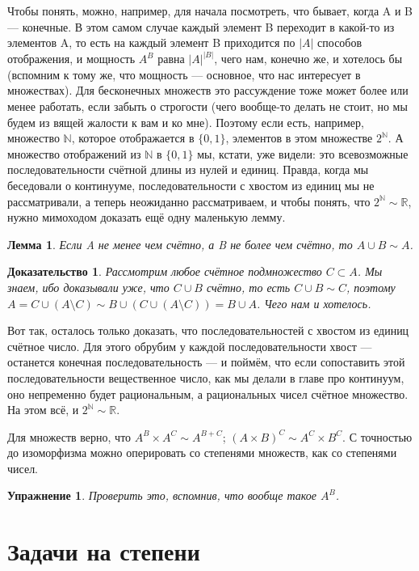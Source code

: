 \documentclass[12pt, onecolumn]{report}
\newtheorem*{lemma}{Лемма}
\newtheorem*{exe}{Упражнение}
\newtheorem*{lproof}{Доказательство}
\begin{document}
Чтобы понять, можно, например, для начала посмотреть, что бывает, когда A и B --- конечные. В этом самом случае каждый элемент B переходит в какой-то из элементов A, то есть на каждый элемент B приходится по $|A|$ способов отображения, и мощность $A^B$ равна $|A|^|B|$, чего нам, конечно же, и хотелось бы (вспомним к тому же, что мощность --- основное, что нас интересует в множествах). Для бесконечных множеств это рассуждение тоже может более или менее работать, если забыть о строгости (чего вообще-то делать не стоит, но мы будем из вящей жалости к вам и ко мне). Поэтому если есть, например, множество $\mathbb N$, которое отображается в $\{0, 1\}$, элементов в этом множестве $2^{\mathbb N}$. А множество отображений из $\mathbb N$ в $\{0, 1\}$ мы, кстати, уже видели: это всевозможные последовательности счётной длины из нулей и единиц. Правда, когда мы беседовали о континууме, последовательности с хвостом из единиц мы не рассматривали, а теперь неожиданно рассматриваем, и чтобы понять, что $2^{\mathbb N} \sim \mathbb R$, нужно мимоходом доказать ещё одну маленькую лемму.

\begin{lemma}
Если A не менее чем счётно, а B не более чем счётно, то $A\cup B \sim A$.
\end{lemma}
\begin{lproof}
\emph{Рассмотрим любое счётное подмножество $C \subset A$. Мы знаем, ибо доказывали уже, что $C \cup B$ счётно, то есть $C \cup B \sim C$, поэтому $A=C\cup (A\setminus C) \sim B\cup (C \cup (A\setminus C)) = B \cup A$. Чего нам и хотелось.}
\end{lproof}

Вот так, осталось только доказать, что последовательностей с хвостом из единиц счётное число. Для этого обрубим у каждой последовательности хвост --- останется конечная последовательность --- и поймём, что если сопоставить этой последовательности вещественное число, как мы делали в главе про континуум, оно непременно будет рациональным, а рациональных чисел счётное множество. На этом всё, и $2^{\mathbb N} \sim \mathbb R$.

Для множеств верно, что $A^B \times A^C \sim A^{B+C}$; $(A \times B)^C \sim A^C \times B^C$. С точностью до изоморфизма можно оперировать со степенями множеств, как со степенями чисел.

\begin{exe}Проверить это, вспомнив, что вообще такое $A^B$.
\end{exe}
\chapter{Задачи на степени}
\end{document}
